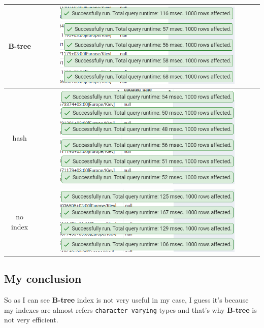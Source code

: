 \begin{center}
    \begin{tabular}{ | c | c |}
        \hline
        B-tree   & \includegraphics[width=0.8\textwidth]{images/query_select_user_with_tickets_by_email_like_performance_b_tree}   \\ \hline
        hash     & \includegraphics[width=0.8\textwidth]{images/query_select_user_with_tickets_by_email_like_performance_hash}     \\ \hline
        no index & \includegraphics[width=0.8\textwidth]{images/query_select_user_with_tickets_by_email_like_performance_no_index} \\ \hline
    \end{tabular}
\end{center}

\subsection{My conclusion}\label{subsec:my-conclusion}

So as I can see \textbf{B-tree} index is not very useful in my case, I guess it's because
my indexes are almost refers \texttt{character varying} types and that's why \textbf{B-tree} is
not very efficient.

